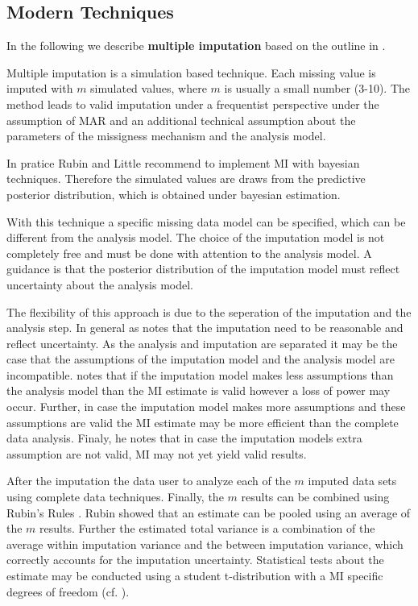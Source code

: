 \subsection{Modern Techniques} 
 In the following we describe \textbf{multiple imputation} based on the outline in \cite{Schafer99}. \par  
Multiple imputation is a simulation based technique. Each missing value is imputed with $m$  simulated  values, where $m$ is usually a small number (3-10). The method leads to valid imputation under a frequentist perspective under the assumption of MAR and an additional technical assumption about the parameters of the missigness mechanism and the analysis model. \par 
  In pratice Rubin and Little \cite{Little} recommend to implement MI with bayesian techniques. Therefore the simulated values are draws from the predictive posterior distribution, which is obtained under bayesian estimation.  \par
 With this technique a specific missing data model can be specified, which can be different from the analysis model. The choice of the imputation model is not completely free and must be done with attention to the analysis model. A guidance is that the posterior distribution of the imputation model must reflect uncertainty about the analysis model. \par The flexibility of this approach is due to the seperation of the imputation and the analysis step. In general as \cite{Schafer99} notes that the imputation need to be reasonable and reflect uncertainty. As the analysis and imputation are separated it may be the case that the assumptions of the imputation model and the analysis model are incompatible. \cite{Schafer99} notes that if the imputation model makes less assumptions than the  analysis model than the MI estimate is valid however a loss of power may occur. Further, in case the imputation model makes more assumptions and these assumptions are valid the MI estimate may be more efficient than the complete data analysis. Finaly, he notes that in case the imputation models extra assumption are not valid, MI may not yet yield valid results.  \par 
After the imputation  the data user to analyze each of the $m$ imputed data sets using complete data techniques. Finally, the $m$ results can be combined using Rubin's Rules \cite{rubin1987multiple}.  Rubin showed that an estimate can be pooled using an average of the $m$ results. Further the estimated total variance is a combination of the average within imputation variance and the between imputation variance, which correctly accounts for the imputation uncertainty. Statistical tests about the estimate may be conducted using a student t-distribution with a MI specific degrees of freedom (cf. \cite{Schafer99}).   \par 
